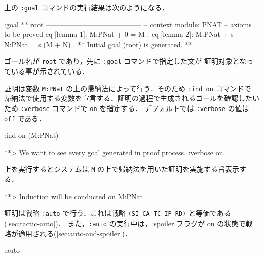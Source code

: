 \documentclass[a4paper,oneside,10pt,here]{memoir}
\newenvironment{vvtm}%
{\parskip=0pt\lineskip=0pt\begin{center}\begin{minipage}{0.8\textwidth}\begin{snugshade}}%
  {\end{snugshade}\end{minipage}\end{center}}
\begin{document}
上の \texttt{:goal} コマンドの実行結果は次のようになる．
\begin{vvtm}
  \begin{simplev}
:goal { ** root -----------------------------------------
  -- context module: PNAT
  -- axioms to be proved
    eq [lemma-1]: M:PNat + 0 = M .
    eq [lemma-2]: M:PNat + s N:PNat = s (M + N) .
}
** Initial goal (root) is generated. **
  \end{simplev}
\end{vvtm}
ゴール名が \texttt{root} であり，先に \texttt{:goal} コマンドで指定した文が
証明対象となっている事が示されている．

証明は変数 \texttt{M:PNat} の上の帰納法によって行う．そのため \texttt{:ind on} コマンドで
帰納法で使用する変数を宣言する．証明の過程で生成されるゴールを確認したいため
\texttt{:verbose} コマンドで \texttt{on} を指定する．
デフォルトでは \texttt{:verbose} の値は \texttt{off} である．
\begin{vvtm}
\begin{simplev}
:ind on (M:PNat)

**> We want to see every goal generated in proof process.
:verbose on 
\end{simplev}
\end{vvtm}
上を実行するとシステムは \texttt{M} の上で帰納法を用いた証明を実施する旨表示する．
\begin{vvtm}
  \begin{simplev}
    **> Induction will be conducted on M:PNat 
  \end{simplev}
\end{vvtm}


証明は戦略 \texttt{:auto} で行う．これは戦略 \texttt{(SI CA TC IP RD)} と等価である(\ref{sec:tactic-auto})．
また，\texttt{:auto} の実行中は，:spoiler フラグが on の状態で戦略が適用される(\ref{sec:auto-and-spoiler})．

\begin{vvtm}
\begin{simplev}
:auto 
\end{simplev}
\end{vvtm}
\end{document}
